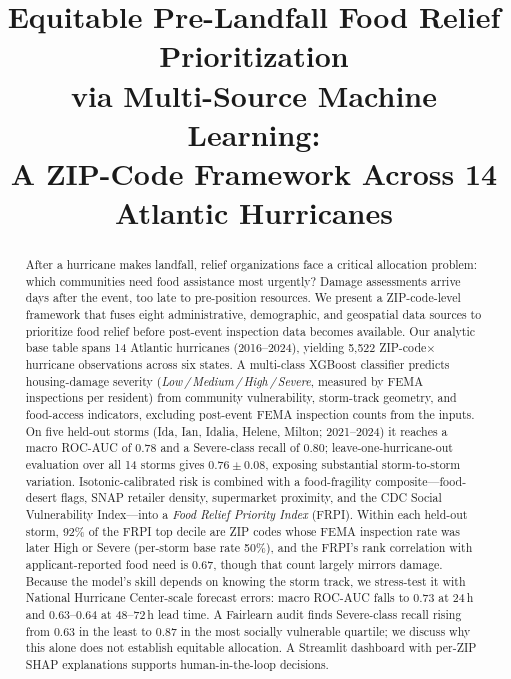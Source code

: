 \documentclass[conference]{IEEEtran}
\renewcommand{\_}{\origunderscore\allowbreak}
\begin{document}
\title{Equitable Pre-Landfall Food Relief Prioritization\\
via Multi-Source Machine Learning:\\
A ZIP-Code Framework Across 14 Atlantic Hurricanes}

\author{
}

\maketitle

\begin{abstract}
After a hurricane makes landfall, relief organizations face a
critical allocation problem: which communities need food
assistance most urgently? Damage assessments arrive days after
the event, too late to pre-position resources. We present a
ZIP-code-level framework that fuses eight administrative,
demographic, and geospatial data sources to prioritize food
relief before post-event inspection data becomes available. Our
analytic base table spans 14 Atlantic hurricanes (2016--2024),
yielding 5,522 ZIP-code$\times$hurricane observations across six
states. A multi-class XGBoost classifier predicts housing-damage
severity (\textit{Low\,/\,Medium\,/\,High\,/\,Severe}, measured by
FEMA inspections per resident)
from community vulnerability, storm-track geometry, and
food-access indicators, excluding post-event FEMA inspection
counts from the inputs. On five held-out storms (Ida, Ian,
Idalia, Helene, Milton; 2021--2024) it reaches a macro ROC-AUC
of 0.78 and a Severe-class recall of 0.80; leave-one-hurricane-out
evaluation over all 14 storms gives $0.76\pm0.08$, exposing
substantial storm-to-storm variation. Isotonic-calibrated risk is
combined with a food-fragility composite---food-desert flags,
SNAP retailer density, supermarket proximity, and the CDC Social
Vulnerability Index---into a \textit{Food Relief Priority Index}
(FRPI). Within each held-out storm, 92\% of the FRPI top decile
are ZIP codes whose FEMA inspection rate was later High or Severe
(per-storm base rate 50\%), and the FRPI's rank correlation with
applicant-reported food need is 0.67, though that count largely
mirrors damage. Because the model's skill depends on knowing the storm track,
we stress-test it with National Hurricane Center-scale forecast
errors: macro ROC-AUC falls to 0.73 at 24\,h and 0.63--0.64 at
48--72\,h lead time. A Fairlearn audit finds Severe-class recall
rising from 0.63 in the least to 0.87 in the most socially
vulnerable quartile; we discuss why this alone does not establish
equitable allocation. A Streamlit dashboard with per-ZIP SHAP
explanations supports human-in-the-loop decisions.
\end{abstract}
\end{document}
